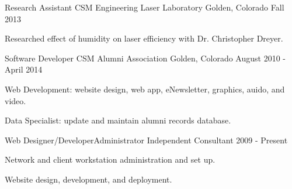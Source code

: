 \begin{cventries}
  \cventry
    {Research Assistant} %
    {CSM Engineering Laser Laboratory} %
    {Golden, Colorado} %
    {Fall 2013} %
    {
      \begin{cvitems} %
        \item {Researched effect of humidity on laser efficiency with Dr. Christopher Dreyer.}
      \end{cvitems}
    }

  \cventry
    {Software Developer} %
    {CSM Alumni Association} %
    {Golden, Colorado} %
    {August 2010 - April 2014} %
    {
      \begin{cvitems} %
        \item {Web Development: website design, web app, eNewsletter, graphics, auido, and video.}
        \item {Data Specialist: update and maintain alumni records database.}
      \end{cvitems}
    }

  \cventry
    {Web Designer/Developer{\enskip\cdotp\enskip}Administrator} %
    {Independent Consultant} %
    {} %
    {2009 - Present} %
    {
      \begin{cvitems} %
        \item {Network and client workstation administration and set up.}
        \item {Website design, development, and deployment.}
      \end{cvitems}
    }

\end{cventries}
